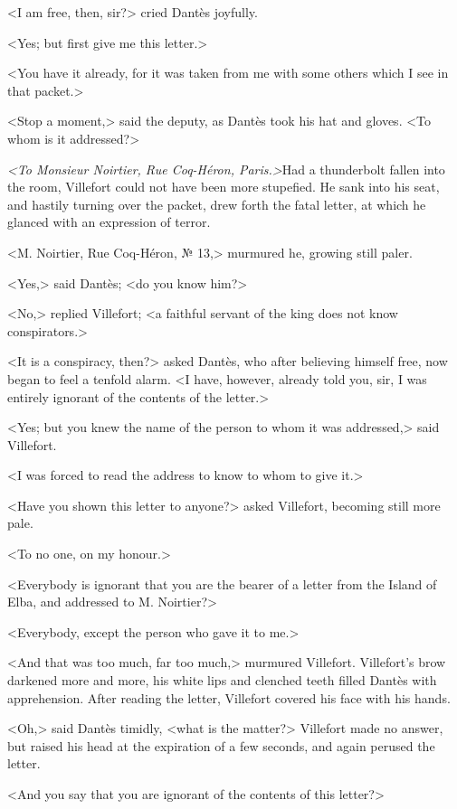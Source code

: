  <I am free, then, sir?> cried Dantès joyfully. 

 <Yes; but first give me this letter.> 

 <You have it already, for it was taken from me with some others which I see in that packet.> 

 <Stop a moment,> said the deputy, as Dantès took his hat and gloves. <To whom is it addressed?> 

 \textit{<To Monsieur Noirtier, Rue Coq-Héron, Paris.>}Had a thunderbolt fallen into the room, Villefort could not have been more stupefied. He sank into his seat, and hastily turning over the packet, drew forth the fatal letter, at which he glanced with an expression of terror. 

 <M. Noirtier, Rue Coq-Héron, № 13,> murmured he, growing still paler. 

 <Yes,> said Dantès; <do you know him?> 

 <No,> replied Villefort; <a faithful servant of the king does not know conspirators.>  
 
 <It is a conspiracy, then?> asked Dantès, who after believing himself free, now began to feel a tenfold alarm. <I have, however, already told you, sir, I was entirely ignorant of the contents of the letter.> 

 <Yes; but you knew the name of the person to whom it was addressed,> said Villefort. 

 <I was forced to read the address to know to whom to give it.> 

 <Have you shown this letter to anyone?> asked Villefort, becoming still more pale. 

 <To no one, on my honour.> 

 <Everybody is ignorant that you are the bearer of a letter from the Island of Elba, and addressed to M. Noirtier?> 

 <Everybody, except the person who gave it to me.> 

 <And that was too much, far too much,> murmured Villefort. Villefort's brow darkened more and more, his white lips and clenched teeth filled Dantès with apprehension. After reading the letter, Villefort covered his face with his hands. 

 <Oh,> said Dantès timidly, <what is the matter?> Villefort made no answer, but raised his head at the expiration of a few seconds, and again perused the letter. 

 <And you say that you are ignorant of the contents of this letter?> 

